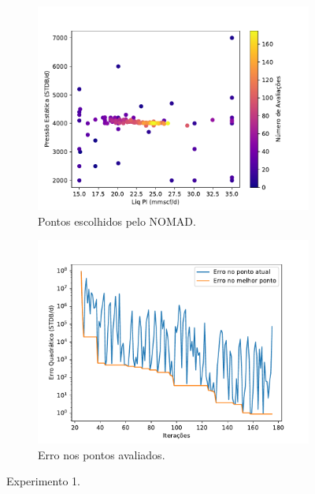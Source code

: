 \begin{figure}
\centering
\begin{subfigure}{0.5\textwidth}
  \centering
  \includegraphics[width=1\linewidth]{figs/setup1_eval_points.pdf}
  \caption{Pontos escolhidos pelo NOMAD.}
  \label{fig:setup1_points}
\end{subfigure}%
\begin{subfigure}{0.5\textwidth}
  \centering
  \includegraphics[width=1\linewidth]{figs/setup1_errors.pdf}
  \caption{Erro nos pontos avaliados.}
  \label{fig:setup1_error}
\end{subfigure}
\caption{Experimento 1.}
\label{fig:setup1_2}
\end{figure}

